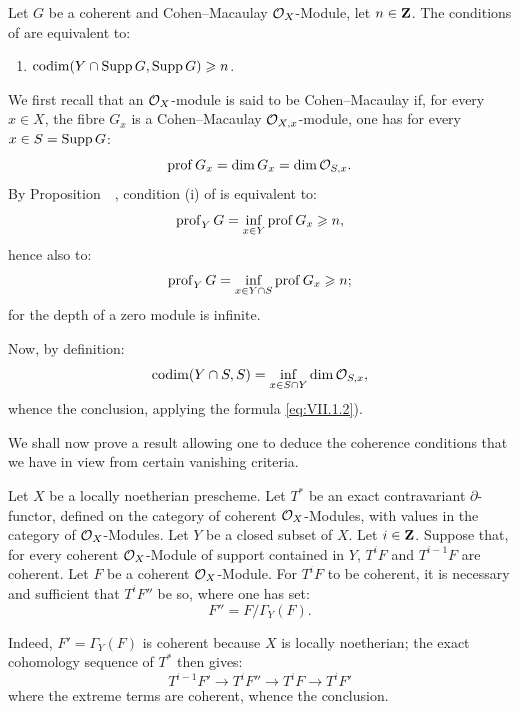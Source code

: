 \begin{corollary}\label{VII.1.4}
Let $G$ be a coherent and Cohen--Macaulay $\mathcal{O}_X$-Module, let $n \in \mathbf{Z}$. The conditions of  are equivalent to:
\begin{enumerate}
\item[\textup{(v)}]\hfill$\operatorname{codim}(Y \cap \operatorname{Supp} G, \operatorname{Supp} G) \geqslant n$.\hfill\null
\end{enumerate}
\end{corollary}
\setcounter{equation}{1}
We first recall that an $\mathcal{O}_X$-module is said to be Cohen--Macaulay if, for every $x \in X$, the fibre $G_x$ is a Cohen--Macaulay ${\mathcal O}_{X, x}$-module, \ie one has for every $x \in S = \operatorname{Supp} G$:
\begin{equation}\label{eq:VII.1.2}
\operatorname{prof} G_x = \dim G_x = \dim {\mathcal O}_{S, x}.
\end{equation}
By Proposition~~, condition (i) of  is equivalent to:
\begin{equation}\label{eq:VII.1.3} \operatorname{prof}_Y G = \inf_{x\in Y} \operatorname{prof} G_x \geqslant n,
\end{equation}
hence also to:
\[
\operatorname{prof}_Y G = \inf_{x \in Y \cap S} \operatorname{prof} G_x \geqslant n;
\]
for the depth of a zero module is infinite.

Now, by definition:
\[
\operatorname{codim} (Y \cap S, S) = \inf_{x \in S \cap Y} \dim {\mathcal O}_{S, x},
\]
whence the conclusion, applying the formula \eqref{eq:VII.1.2}).

We shall now prove a result allowing one to deduce the coherence conditions that we have in view from certain vanishing criteria.

\begin{lemma}\label{VII.1.5}
Let $X$ be a locally noetherian prescheme. Let $T^{\ast}$ be an exact contravariant $\partial$-functor, defined on the category of coherent $\mathcal{O}_X$-Modules, with values in the category of $\mathcal{O}_X$-Modules. Let $Y$ be a closed subset of $X$. Let $i \in \mathbf{Z}$. Suppose that, for every coherent $\mathcal{O}_X$-Module of support contained in $Y$, $T^i F$ and $T^{i-1} F$ are coherent. Let $F$ be a coherent $\mathcal{O}_X$-Module. For $T^i F$ to be coherent, it is necessary and sufficient that $T^i F''$ be so, where one has set:
\[
F'' = F / \Gamma_Y (F).
\]
\end{lemma}

Indeed, $F' = \Gamma_Y (F)$ is coherent because $X$ is locally noetherian; the exact cohomology sequence of $T^{\ast}$ then gives:
\[
T^{i-1}F' \to T^i F'' \to T^i F \to T^i F'
\]
where the extreme terms are coherent, whence the conclusion.

